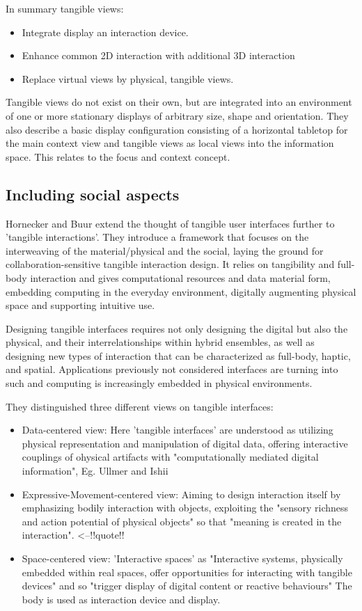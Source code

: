 In summary tangible views:
\begin{itemize}
\item Integrate display an interaction device.
\item Enhance common 2D interaction with additional 3D interaction
\item Replace virtual views by physical, tangible views.
\end{itemize}

Tangible views do not exist on their own, but are integrated into an environment of one or more stationary displays of arbitrary size, shape and orientation. 
They also describe a basic display configuration consisting of a horizontal tabletop for the main context view and tangible views as local views into the information space. This relates to the focus and context concept.



\subsection{Including social aspects}
Hornecker and Buur \cite{hornecker06} extend the thought of tangible user interfaces further to 'tangible interactions'. They introduce a framework that focuses on the interweaving of the material/physical and the social, laying the ground for collaboration-sensitive tangible interaction design. It relies on tangibility and full-body interaction and gives computational resources and data material form, embedding computing in the everyday environment, digitally augmenting physical space and supporting intuitive use. 

Designing tangible interfaces requires not only designing the digital but also the physical, and their interrelationships within hybrid ensembles, as well as designing new types of interaction that can be characterized as full-body, haptic, and spatial.
Applications previously not considered interfaces are turning into such and computing is increasingly embedded in physical environments.

They distinguished three different views on tangible interfaces:
\begin{itemize}
\item Data-centered view: Here 'tangible interfaces' are understood as utilizing physical representation and manipulation of digital data, offering interactive couplings of ohysical artifacts with "computationally mediated digital information", Eg. Ullmer and Ishii
\item Expressive-Movement-centered view: Aiming to design interaction itself by emphasizing bodily interaction with objects, exploiting the "sensory richness and action potential of physical objects" so that "meaning is created in the interaction". <--!!quote!!
\item Space-centered view: 'Interactive spaces' as "Interactive systems, physically embedded within real spaces, offer opportunities for interacting with tangible devices" and so "trigger display of digital content or reactive behaviours" The body is used as interaction device and display.
\end{itemize}

